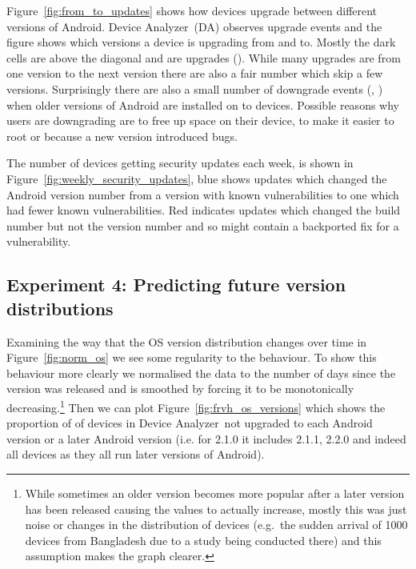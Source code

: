 \documentclass[conference,a4paper,twoside]{IEEEtran}
\let\OldTodo\todo
\renewcommand{\todo}{\OldTodo[inline]}
\newcommand{\da}{Device Analyzer}
\begin{document}
Figure~\ref{fig:from_to_updates} shows how devices upgrade between different versions of Android.
\da\ (DA) observes upgrade events and the figure shows which versions a device is upgrading from and to.
Mostly the dark cells are above the diagonal and are upgrades (\daNumUpdatesUpgrades).
While many upgrades are from one version to the next version there are also a fair number which skip a few versions.
Surprisingly there are also a small number of downgrade events (\daNumUpdatesDowngrades, \daPercUpdatesDowngrades) when older versions of Android are installed on to devices.
Possible reasons why users are downgrading are to free up space on their device, to make it easier to root or because a new version introduced bugs.

The number of devices getting security updates each week, is shown in Figure~\ref{fig:weekly_security_updates}, blue shows updates which changed the Android version number from a version with known vulnerabilities to one which had fewer known vulnerabilities.
Red indicates updates which changed the build number but not the version number and so might contain a backported fix for a vulnerability.
\todo{ summary stats, what does this mean}





\subsection{Experiment 4: Predicting future version distributions}\label{sec:exp:predicting_distributions}
Examining the way that the OS version distribution changes over time in Figure~\ref{fig:norm_os} we see some regularity to the behaviour.
To show this behaviour more clearly we normalised the data to the number of days since the version was released and is smoothed by forcing it to be monotonically decreasing.\footnote{While sometimes an older version becomes more popular after a later version has been released causing the values to actually increase, mostly this was just noise or changes in the distribution of devices (e.g.\ the sudden arrival of 1000 devices from Bangladesh due to a study being conducted there) and this assumption makes the graph clearer.}
Then we can plot Figure~\ref{fig:frvh_os_versions} which shows the proportion of of devices in \da\ not upgraded to each Android version or a later Android version (i.e. for 2.1.0 it includes 2.1.1, 2.2.0 and indeed all devices as they all run later versions of Android).
\end{document}

